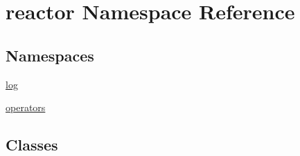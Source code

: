 \hypertarget{namespacereactor}{}\section{reactor Namespace Reference}
\label{namespacereactor}
\subsection*{Namespaces}
\begin{DoxyCompactItemize}
\item 
 \hyperlink{namespacereactor_1_1log}{log}
\item 
 \hyperlink{namespacereactor_1_1operators}{operators}
\end{DoxyCompactItemize}
\subsection*{Classes}
